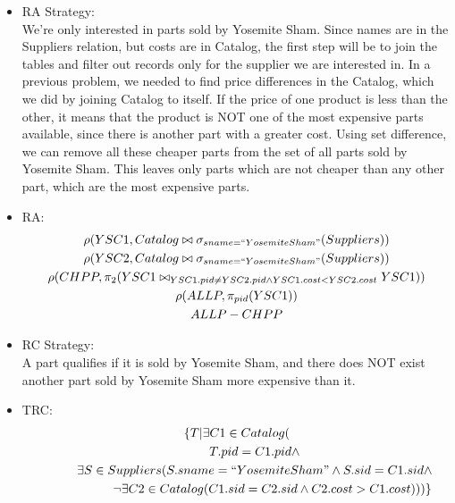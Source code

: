 \documentclass[12pt]{article}
\begin{document}
\begin{enumerate}
\begin{itemize}
\item RA Strategy: \\
We're only interested in parts sold by Yosemite Sham. Since names are in the Suppliers relation, but costs are in Catalog, the first step will be to join the tables and filter out records only for the supplier we are interested in. In a previous problem, we needed to find price differences in the Catalog, which we did by joining Catalog to itself. If the price of one product is less than the other, it means that the product is NOT one of the most expensive parts available, since there is another part with a greater cost. Using set difference, we can remove all these cheaper parts from the set of all parts sold by Yosemite Sham. This leaves only parts which are not cheaper than any other part, which are the most expensive parts.
\item RA: \\
\begin{multline*}
\rho(YSC1, Catalog \bowtie \sigma_{sname=``Yosemite Sham"}(Suppliers)) \\
\rho(YSC2, Catalog \bowtie \sigma_{sname=``Yosemite Sham"}(Suppliers)) \\
\rho(CHPP, \pi_{2}(YSC1 \bowtie_{YSC1.pid \neq YSC2.pid \wedge YSC1.cost < YSC2.cost} YSC1))\\
\rho(ALLP, \pi_{pid}(YSC1))\\
ALLP-CHPP\\
\end{multline*}
\item RC Strategy: \\
A part qualifies if it is sold by Yosemite Sham, and there does NOT exist another part sold by Yosemite Sham more expensive than it.
\item TRC:
\begin{multline*}
\{T|\exists C1 \in Catalog( \\
	\hspace{1cm}T.pid = C1.pid \wedge \\
	\hspace{1cm}\exists S \in Suppliers(S.sname = ``Yosemite Sham" \wedge S.sid = C1.sid \wedge \\
	\hspace{2cm}\neg\exists C2 \in Catalog(C1.sid = C2.sid \wedge C2.cost > C1.cost)))\} \\
\end{multline*}
\end{itemize}	
	

\end{enumerate}
\end{document}
